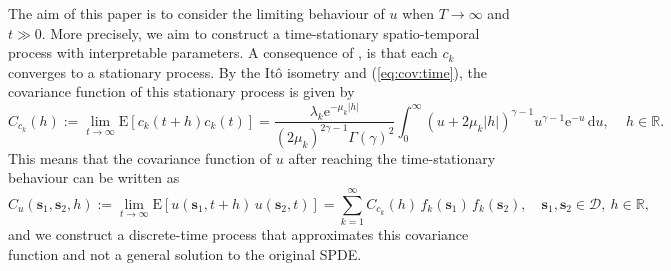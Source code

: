 \documentclass[12pt]{article} %
\begin{document}
The aim of this paper is to consider the limiting behaviour of $u$ when $T\rightarrow \infty$ and $t \gg 0$. More precisely, we aim to construct a time-stationary spatio-temporal process with interpretable parameters. A consequence of \citet[Corollary 4.2]{kirchner2022}, is that each $c_k$ converges to a stationary process. By the Itô isometry and (\ref{eq:cov:time}), the covariance function of this stationary process is given by
\begin{equation} \label{eq:time-process-covariance-function}
C_{c_k}(h) := \lim_{t \rightarrow \infty} \mathrm{E}[c_k(t + h) c_k(t)] = \frac{\lambda_k \mathrm{e}^{-\mu_k |h|}}{(2 \mu_k)^{2 \gamma - 1} \Gamma(\gamma)^2} \int_0^\infty (u + 2 \mu_k |h|)^{\gamma - 1} u^{\gamma - 1} \mathrm{e}^{-u} \, \mathrm{d}u, \, \quad h\in \mathbb{R}.
\end{equation}
This means that the covariance function of $u$ after reaching the time-stationary behaviour can be written as
\begin{equation} \label{eq:process-covariance-function}
C_{u}(\boldsymbol{s}_1, \boldsymbol{s}_2, h) := \lim_{t \rightarrow \infty} \mathrm{E}[u(\boldsymbol{s}_1, t + h)\, u(\boldsymbol{s}_2, t)] = \sum_{k=1}^\infty  C_{c_k}(h)\, f_k(\boldsymbol{s}_1)\,f_k(\boldsymbol{s}_2), \quad  \boldsymbol{s}_1, \boldsymbol{s}_2\in\mathcal{D}, \ h\in \mathbb{R},
\end{equation}
and we construct a discrete-time process that approximates this covariance function and not
a general solution to the original SPDE.
\end{document}
